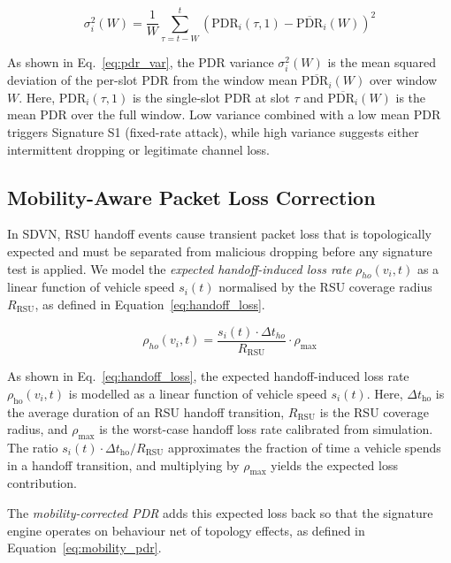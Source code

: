 \documentclass[12pt, a4paper]{report}
\begin{document}
\begin{equation}
\label{eq:pdr_var}
\sigma^2_i(W) = \frac{1}{W} \sum_{\tau=t-W}^{t}
\!\left(\text{PDR}_i(\tau,1) - \overline{\text{PDR}}_i(W)\right)^2
\end{equation}

As shown in Eq.~\eqref{eq:pdr_var}, the PDR variance $\sigma_i^2(W)$ is the mean squared deviation of the per-slot PDR from the window mean $\overline{\text{PDR}_i}(W)$ over window $W$. Here, $\text{PDR}_i(\tau, 1)$ is the single-slot PDR at slot $\tau$ and $\overline{\text{PDR}_i}(W)$ is the mean PDR over the full window. Low variance combined with a low mean PDR triggers Signature S1 (fixed-rate attack), while high variance suggests either intermittent dropping or legitimate channel loss.


\subsection{Mobility-Aware Packet Loss Correction}

In SDVN, RSU handoff events cause transient packet loss that is topologically
expected and must be separated from malicious dropping before any signature
test is applied. We model the \emph{expected handoff-induced loss rate}
$\rho_{ho}(v_i, t)$ as a linear function of vehicle speed $s_i(t)$ normalised
by the RSU coverage radius $R_{\text{RSU}}$, as defined in Equation~\eqref{eq:handoff_loss}.

\begin{equation}
\label{eq:handoff_loss}
\rho_{ho}(v_i, t) = \frac{s_i(t) \cdot \Delta t_{ho}}{R_{\text{RSU}}}
\cdot \rho_{\max}
\end{equation}

As shown in Eq.~\eqref{eq:handoff_loss}, the expected handoff-induced loss rate $\rho_{\text{ho}}(v_i, t)$ is modelled as a linear function of vehicle speed $s_i(t)$. Here, $\Delta t_{\text{ho}}$ is the average duration of an RSU handoff transition, $R_{\text{RSU}}$ is the RSU coverage radius, and $\rho_{\text{max}}$ is the worst-case handoff loss rate calibrated from simulation. The ratio $s_i(t) \cdot \Delta t_{\text{ho}} / R_{\text{RSU}}$ approximates the fraction of time a vehicle spends in a handoff transition, and multiplying by $\rho_{\text{max}}$ yields the expected loss contribution.

The \emph{mobility-corrected PDR} adds this expected loss back so that the
signature engine operates on behaviour net of topology effects, as defined in Equation~\eqref{eq:mobility_pdr}.
\end{document}
